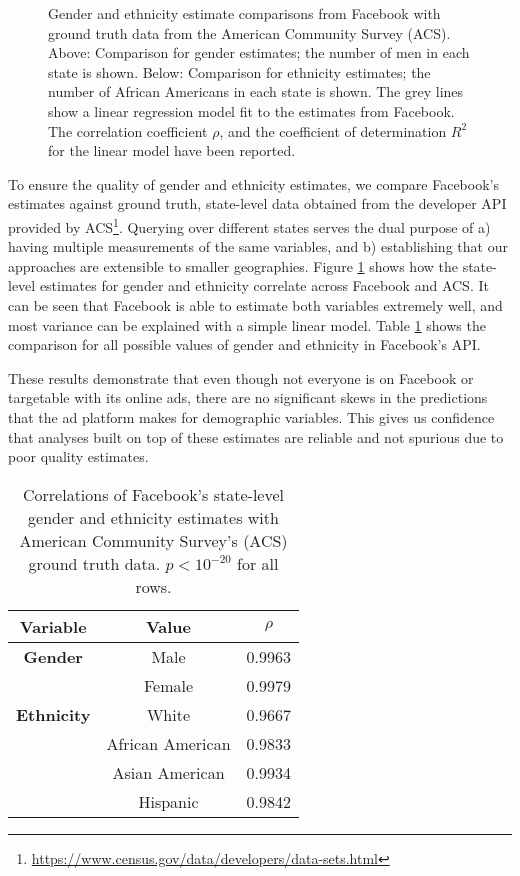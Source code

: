 \begin{figure}
    \centering
    \qquad

    \caption{Gender and ethnicity estimate comparisons from Facebook with ground truth data from the American Community Survey (ACS). Above: Comparison for gender estimates; the number of men in each state is shown. Below: Comparison for ethnicity estimates; the number of African Americans in each state is shown. The grey lines show a linear regression model fit to the estimates from Facebook. The correlation coefficient $\rho$, and the coefficient of determination $R^2$ for the linear model have been reported.}
    \label{fig:corrs}
\end{figure}

To ensure the quality of gender and ethnicity estimates, we compare Facebook's estimates against ground truth, state-level data obtained from the developer API provided by ACS\footnote{\url{https://www.census.gov/data/developers/data-sets.html}}. Querying over different states serves the dual purpose of a) having multiple measurements of the same variables, and b) establishing that our approaches are extensible to smaller geographies. Figure \ref{fig:corrs} shows how the state-level estimates for gender and ethnicity correlate across Facebook and ACS. It can be seen that Facebook is able to estimate both variables extremely well, and most variance can be explained with a simple linear model. Table \ref{tab:corrs} shows the comparison for all possible values of gender and ethnicity in Facebook's API.

These results demonstrate that even though not everyone is on Facebook or targetable with its online ads, there are no significant skews in the predictions that the ad platform makes for demographic variables. This gives us confidence that analyses built on top of these estimates are reliable and not spurious due to poor quality estimates.

\begin{table}
\centering
\begin{tabular}{c | c | c } 
\toprule
\textbf{Variable} & \textbf{Value} & \textbf{$\rho$}\\
 \hline
\textbf{Gender} & Male & 0.9963\\
& Female & 0.9979\\
 \hline
 \textbf{Ethnicity} & White & 0.9667\\
 & African American & 0.9833\\
 & Asian American & 0.9934\\
 & Hispanic & 0.9842\\
\end{tabular}
\caption{Correlations of Facebook's state-level gender and ethnicity estimates with American Community Survey's (ACS) ground truth data. $p < 10^{-20}$ for all rows.}
\label{tab:corrs}
\end{table}


